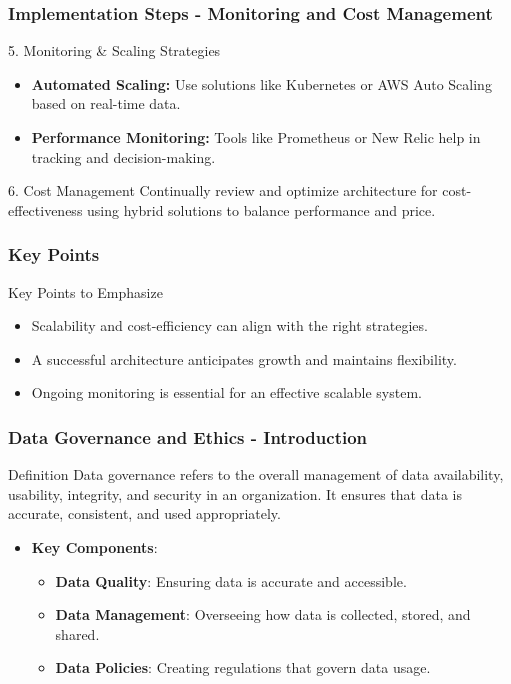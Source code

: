 \documentclass{beamer}
\begin{document}
\begin{frame}[fragile]
    \frametitle{Implementation Steps - Monitoring and Cost Management}
    \begin{block}{5. Monitoring \& Scaling Strategies}
        \begin{itemize}
            \item \textbf{Automated Scaling:} Use solutions like Kubernetes or AWS Auto Scaling based on real-time data.
            \item \textbf{Performance Monitoring:} Tools like Prometheus or New Relic help in tracking and decision-making.
        \end{itemize}
    \end{block}
    
    \begin{block}{6. Cost Management}
        Continually review and optimize architecture for cost-effectiveness using hybrid solutions to balance performance and price.
    \end{block}
\end{frame}

\begin{frame}[fragile]
    \frametitle{Key Points}
    \begin{block}{Key Points to Emphasize}
        \begin{itemize}
            \item Scalability and cost-efficiency can align with the right strategies.
            \item A successful architecture anticipates growth and maintains flexibility.
            \item Ongoing monitoring is essential for an effective scalable system.
        \end{itemize}
    \end{block}
\end{frame}

\begin{frame}[fragile]
    \frametitle{Data Governance and Ethics - Introduction}
    \begin{block}{Definition}
        Data governance refers to the overall management of data availability, usability, integrity, and security in an organization. It ensures that data is accurate, consistent, and used appropriately.
    \end{block}
    \begin{itemize}
        \item \textbf{Key Components}:
        \begin{itemize}
            \item \textbf{Data Quality}: Ensuring data is accurate and accessible.
            \item \textbf{Data Management}: Overseeing how data is collected, stored, and shared.
            \item \textbf{Data Policies}: Creating regulations that govern data usage.
        \end{itemize}
    \end{itemize}
\end{frame}
\end{document}
